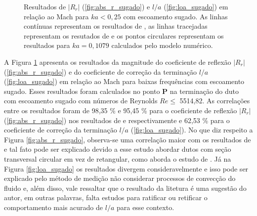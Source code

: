 \begin{figure}[ht!]
\begin{subfigure}{\scaleA \textwidth}
  
\end{subfigure}%
\begin{subfigure}{\scaleA \textwidth}
  
\end{subfigure}
\caption[Resultados de $|R_{r}|$ e $l/a$ em relação ao Mach para baixas frequências com escoamento sugado]{Resultados de $|R_{r}|$ (\ref{fig:abs_r_sugado}) e $l/a$ (\ref{fig:loa_sugado}) em relação ao Mach para $ka < 0,25$ com escoamento sugado. As linhas contínuas representam os resultados de , as linhas tracejadas representam os resutados de  e os pontos circulares representam os resultados para $ka = 0,1079$ calculados pelo modelo numérico.}
\label{fig:resultados_sugado}
\end{figure}


A Figura \ref{fig:resultados_sugado} apresenta os resultados da magnitude do coeficiente de reflexão $|R_{r}|$ (\ref{fig:abs_r_sugado}) e do coeficiente de correção da terminação $l/a$ (\ref{fig:loa_sugado}) em relação ao Mach para baixas frequências com escoamento sugado. Esses resultados foram calculados no ponto $\textbf{P}$ na terminação do duto com escoamento sugado com números de Reynolds $Re \leq$ 5514,82. As correlações entre os resultados foram de 98,35 \% e 95,45 \% para o coeficiente de reflexão $|R_{r}|$ (\ref{fig:abs_r_sugado}) nos resultados de  e  respectivamente e 62,53 \% para o coeficiente de correção da terminação $l/a$ (\ref{fig:loa_sugado}). No que diz respeito a Figura \ref{fig:abs_r_sugado}, observa-se uma correlação maior com os resultados de  e tal fato pode ser explicado devido a esse estudo abordar dutos com seção transversal circular em vez de retangular, como aborda o estudo de . Já na Figura \ref{fig:loa_sugado} os resultados divergem consideravelmente e isso pode ser explicado pelo método de medição não considerar processos de convecção do fluido e, além disso, vale ressaltar que o resultado da litetura é uma sugestão do autor, em outras palavras, falta estudos para ratificar ou retificar o comportamento mais acurado de $l/a$ para esse contexto.

\begin{figure}[ht!]
  \centering
  
\end{figure}

